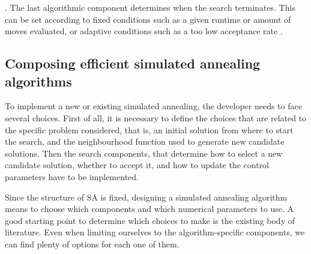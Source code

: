 {\stoppingcriterion.}
The last algorithmic component determines when the search terminates.
This can be set according to fixed conditions such as a given runtime
or amount of moves evaluated, or adaptive conditions such as a too low
acceptance rate \cite{JohAraMcGSch1989,JohAraMcGSch1991}.


\subsection{Composing efficient simulated annealing algorithms}
To implement a new or existing simulated annealing, the developer needs
to face several choices. First of all, 
it is necessary to define the choices
that are related to the specific problem considered, that is, an initial
solution from where to start the search, and the neighbourhood function
used to generate new candidate solutions.
Then the search components, that determine how to select a new candidate
solution, whether to accept it, and how to update the control parameters
have to be implemented.

Since the structure of SA is fixed, designing a simulated annealing algorithm
means to choose which components and which numerical parameters
to use. 
A good starting point to determine which choices to make is the existing body of literature.
Even when limiting ourselves to the algorithm-specific components,
we can find plenty of options for each one of them. 


